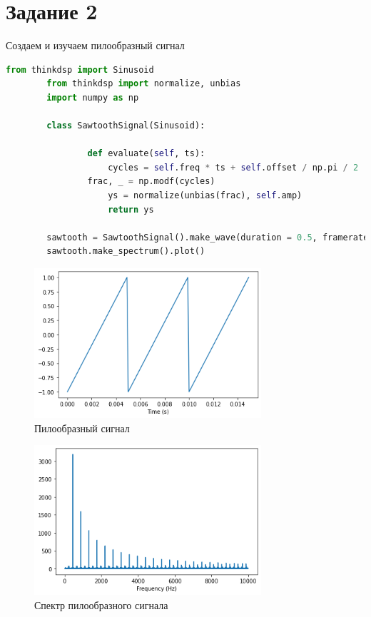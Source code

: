 \documentclass[a4paper, 12pt]{report}
\begin{document}
	\section{Задание 2}
	Создаем и изучаем пилообразный сигнал
	\begin{lstlisting}[language=Python,caption=Получение пилообразного сигнала]
		from thinkdsp import Sinusoid
		from thinkdsp import normalize, unbias
		import numpy as np

		class SawtoothSignal(Sinusoid):
    
    			def evaluate(self, ts):
        			cycles = self.freq * ts + self.offset / np.pi / 2
       			frac, _ = np.modf(cycles)
        			ys = normalize(unbias(frac), self.amp)
        			return ys
		
		sawtooth = SawtoothSignal().make_wave(duration = 0.5, framerate = 20000)
		sawtooth.make_spectrum().plot()
	\end{lstlisting}
	\begin{figure}[H]
		\centering
		\includegraphics[width=0.75\textwidth]{pil_segment.png}
		\caption{Пилообразный сигнал}
		\label{fig:pil_segment}
	\end{figure}
	\begin{figure}[H]
		\centering
		\includegraphics[width=0.75\textwidth]{pil_spectrum.png}
		\caption{Спектр пилообразного сигнала}
		\label{fig:pil_spectrum}
	\end{figure}
\end{document}
